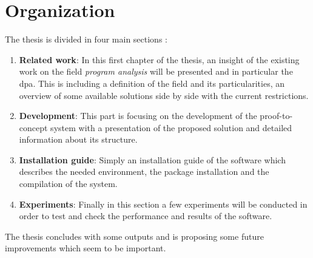 \section{Organization}
The thesis is divided in four main sections :
\begin{enumerate}
  \item \textbf{Related work}: In this first chapter of the thesis, an insight of the existing work on the field \textit{program analysis} will be presented and in particular the \gls{dpa}. This is including a definition of the field and its particularities, an overview of some available solutions side by side with the current restrictions.
  \item \textbf{Development}: This part is focusing on the development of the proof-to-concept system with a presentation of the proposed solution and detailed information about its structure.
  \item \textbf{Installation guide}: Simply an installation guide of the software which describes the needed environment, the package installation and the compilation of the system.
  \item \textbf{Experiments}: Finally in this section a few experiments will be conducted in order to test and check the performance and results of the software.
\end{enumerate}
The thesis concludes with some outputs and is proposing some future improvements which seem to be important.
